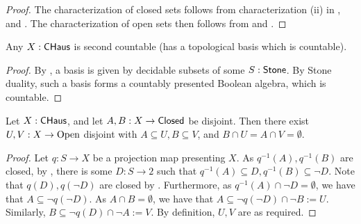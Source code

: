 \begin{proof}
  The characterization of closed sets follows from characterization (ii) in , 
  and . 
  The characterization of open sets then follows from  and .
\end{proof}
\begin{corollary}
  Any $X:\mathsf{CHaus}$ is second countable (has a topological basis which is countable). 
\end{corollary}
\begin{proof}
  By , a basis is given by decidable subsets of some $S:\mathsf{Stone}$. 
  By Stone duality, such a basis forms a countably presented Boolean algebra, which is countable. 
\end{proof}

\begin{lemma}\label{CHausSeperationOfClosedByOpens}
  Let $X:\mathsf{CHaus}$, and let $A,B:X\to \mathsf{Closed}$ be disjoint. 
  Then there exist $U,V:X\to \mathrm{Open}$ disjoint with $A\subseteq U, B\subseteq V$, 
  and $B\cap U = A \cap V = \emptyset$. 
\end{lemma}
\begin{proof}
  Let $q:S\to X$ be a projection map presenting $X$.
  As $q^{-1}(A), q^{-1}(B)$ are closed, 
  by , there is some $D:S \to 2$ such that
  $q^{-1}(A) \subseteq D, q^{-1}(B) \subseteq \neg D$. 
  Note that $q(D), q(\neg D)$ are closed by . 
  Furthermore, as $q^{-1}(A) \cap \neg D  =\emptyset$, we have that 
  $A\subseteq \neg q (\neg D)$. As $A\cap B = \emptyset$, we have that 
  $A\subseteq \neg q (\neg D) \cap \neg B:= U$.
  Similarly, $B\subseteq \neg  q (D) \cap \neg A:= V$. 
  By definition, $U,V$ are as required. 
\end{proof}

